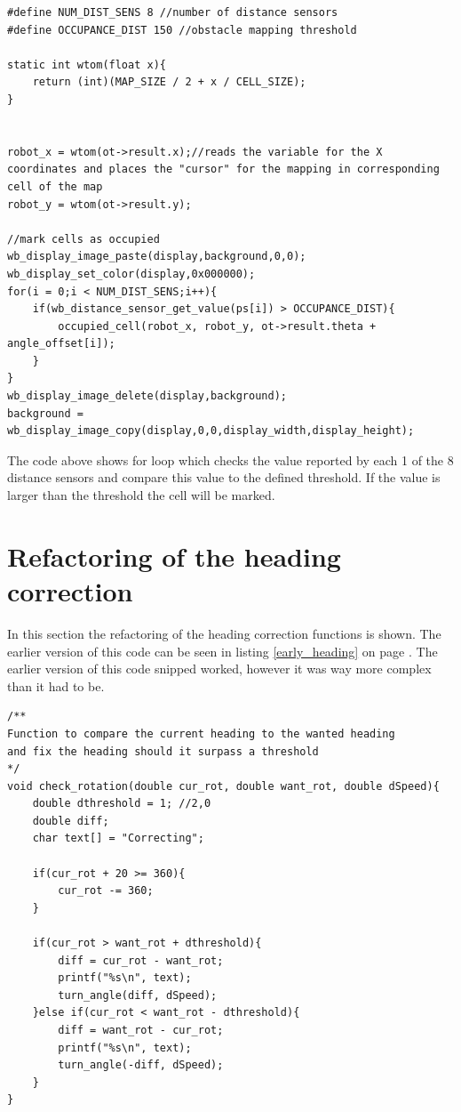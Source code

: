 \begin{lstlisting}[caption={obstacle detection and mapping}]
#define NUM_DIST_SENS 8 //number of distance sensors
#define OCCUPANCE_DIST 150 //obstacle mapping threshold

static int wtom(float x){
    return (int)(MAP_SIZE / 2 + x / CELL_SIZE);
}


robot_x = wtom(ot->result.x);//reads the variable for the X coordinates and places the "cursor" for the mapping in corresponding cell of the map
robot_y = wtom(ot->result.y);

//mark cells as occupied
wb_display_image_paste(display,background,0,0);
wb_display_set_color(display,0x000000);
for(i = 0;i < NUM_DIST_SENS;i++){
    if(wb_distance_sensor_get_value(ps[i]) > OCCUPANCE_DIST){
        occupied_cell(robot_x, robot_y, ot->result.theta + angle_offset[i]);
    }
}
wb_display_image_delete(display,background);
background = wb_display_image_copy(display,0,0,display_width,display_height);
\end{lstlisting}

The code above shows for loop which checks the value reported by each 1 of the 8 distance sensors and compare this value to the defined threshold. If the value is larger than the threshold the cell will be marked.

\section{Refactoring of the heading correction}
In this section the refactoring of the heading correction functions is shown.
The earlier version of this code can be seen in listing \ref{early_heading} on page \pageref{early_heading}.
The earlier version of this code snipped worked, however it was way more complex than it had to be.

\begin{lstlisting}[caption={Refactored heading control code} ]
/**
Function to compare the current heading to the wanted heading
and fix the heading should it surpass a threshold
*/
void check_rotation(double cur_rot, double want_rot, double dSpeed){
    double dthreshold = 1; //2,0
    double diff;
    char text[] = "Correcting";
    
    if(cur_rot + 20 >= 360){
        cur_rot -= 360;
    }
    
    if(cur_rot > want_rot + dthreshold){
        diff = cur_rot - want_rot;
        printf("%s\n", text);
        turn_angle(diff, dSpeed);
    }else if(cur_rot < want_rot - dthreshold){
        diff = want_rot - cur_rot;
        printf("%s\n", text);
        turn_angle(-diff, dSpeed);
    }
}
\end{lstlisting}

